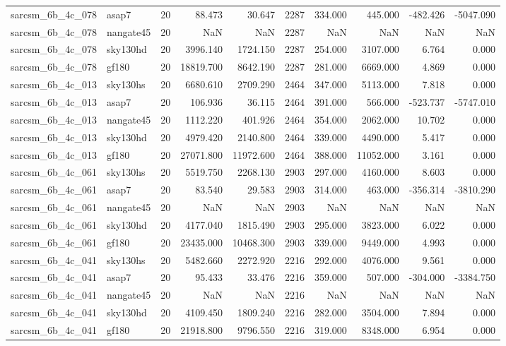 \begin{tabular}{llrrrrrrrr}
sarcsm\_6b\_4c\_078 & asap7 & 20 & 88.473 & 30.647 & 2287 & 334.000 & 445.000 & -482.426 & -5047.090 \\
sarcsm\_6b\_4c\_078 & nangate45 & 20 & NaN & NaN & 2287 & NaN & NaN & NaN & NaN \\
sarcsm\_6b\_4c\_078 & sky130hd & 20 & 3996.140 & 1724.150 & 2287 & 254.000 & 3107.000 & 6.764 & 0.000 \\
sarcsm\_6b\_4c\_078 & gf180 & 20 & 18819.700 & 8642.190 & 2287 & 281.000 & 6669.000 & 4.869 & 0.000 \\
sarcsm\_6b\_4c\_013 & sky130hs & 20 & 6680.610 & 2709.290 & 2464 & 347.000 & 5113.000 & 7.818 & 0.000 \\
sarcsm\_6b\_4c\_013 & asap7 & 20 & 106.936 & 36.115 & 2464 & 391.000 & 566.000 & -523.737 & -5747.010 \\
sarcsm\_6b\_4c\_013 & nangate45 & 20 & 1112.220 & 401.926 & 2464 & 354.000 & 2062.000 & 10.702 & 0.000 \\
sarcsm\_6b\_4c\_013 & sky130hd & 20 & 4979.420 & 2140.800 & 2464 & 339.000 & 4490.000 & 5.417 & 0.000 \\
sarcsm\_6b\_4c\_013 & gf180 & 20 & 27071.800 & 11972.600 & 2464 & 388.000 & 11052.000 & 3.161 & 0.000 \\
sarcsm\_6b\_4c\_061 & sky130hs & 20 & 5519.750 & 2268.130 & 2903 & 297.000 & 4160.000 & 8.603 & 0.000 \\
sarcsm\_6b\_4c\_061 & asap7 & 20 & 83.540 & 29.583 & 2903 & 314.000 & 463.000 & -356.314 & -3810.290 \\
sarcsm\_6b\_4c\_061 & nangate45 & 20 & NaN & NaN & 2903 & NaN & NaN & NaN & NaN \\
sarcsm\_6b\_4c\_061 & sky130hd & 20 & 4177.040 & 1815.490 & 2903 & 295.000 & 3823.000 & 6.022 & 0.000 \\
sarcsm\_6b\_4c\_061 & gf180 & 20 & 23435.000 & 10468.300 & 2903 & 339.000 & 9449.000 & 4.993 & 0.000 \\
sarcsm\_6b\_4c\_041 & sky130hs & 20 & 5482.660 & 2272.920 & 2216 & 292.000 & 4076.000 & 9.561 & 0.000 \\
sarcsm\_6b\_4c\_041 & asap7 & 20 & 95.433 & 33.476 & 2216 & 359.000 & 507.000 & -304.000 & -3384.750 \\
sarcsm\_6b\_4c\_041 & nangate45 & 20 & NaN & NaN & 2216 & NaN & NaN & NaN & NaN \\
sarcsm\_6b\_4c\_041 & sky130hd & 20 & 4109.450 & 1809.240 & 2216 & 282.000 & 3504.000 & 7.894 & 0.000 \\
sarcsm\_6b\_4c\_041 & gf180 & 20 & 21918.800 & 9796.550 & 2216 & 319.000 & 8348.000 & 6.954 & 0.000 \\

\end{tabular}
